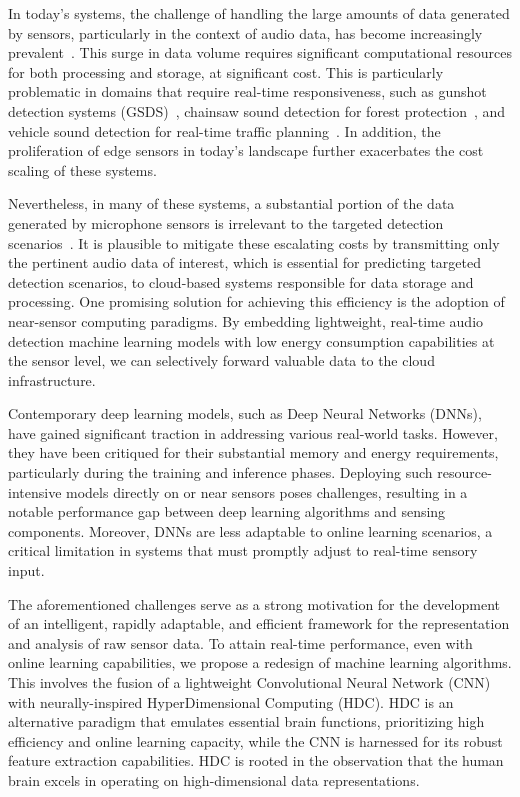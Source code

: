 
In today's systems, the challenge of handling the large amounts of data generated by sensors, particularly in the context of audio data, has become increasingly prevalent~\cite{zaman2023survey}. This surge in data volume requires significant computational resources for both processing and storage, at significant cost. This is particularly problematic in domains that require real-time responsiveness, such as gunshot detection systems (GSDS)~\cite{hansen2021gunshot}, chainsaw sound detection for forest protection~\cite{somwong2023acoustic}, and vehicle sound detection for real-time traffic planning~\cite{10078155}. In addition, the proliferation of edge sensors in today's landscape further exacerbates the cost scaling of these systems.

Nevertheless, in many of these systems, a substantial portion of the data generated by microphone sensors is irrelevant to the targeted detection scenarios~\cite{calhoun2021precision}. It is plausible to mitigate these escalating costs by transmitting only the pertinent audio data of interest, which is essential for predicting targeted detection scenarios, to cloud-based systems responsible for data storage and processing. One promising solution for achieving this efficiency is the adoption of near-sensor computing paradigms. By embedding lightweight, real-time audio detection machine learning models with low energy consumption capabilities at the sensor level, we can selectively forward valuable data to the cloud infrastructure.

Contemporary deep learning models, such as Deep Neural Networks (DNNs), have gained significant traction in addressing various real-world tasks. However, they have been critiqued for their substantial memory and energy requirements, particularly during the training and inference phases. Deploying such resource-intensive models directly on or near sensors poses challenges, resulting in a notable performance gap between deep learning algorithms and sensing components. Moreover, DNNs are less adaptable to online learning scenarios, a critical limitation in systems that must promptly adjust to real-time sensory input.

The aforementioned challenges serve as a strong motivation for the development of an intelligent, rapidly adaptable, and efficient framework for the representation and analysis of raw sensor data. To attain real-time performance, even with online learning capabilities, we propose a redesign of machine learning algorithms. This involves the fusion of a lightweight Convolutional Neural Network (CNN) with neurally-inspired HyperDimensional Computing (HDC). HDC is an alternative paradigm that emulates essential brain functions, prioritizing high efficiency and online learning capacity, while the CNN is harnessed for its robust feature extraction capabilities. HDC is rooted in the observation that the human brain excels in operating on high-dimensional data representations.

